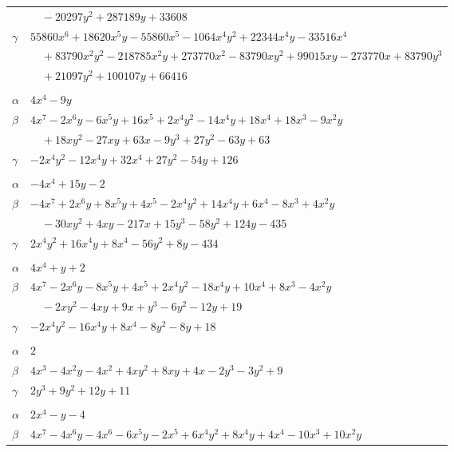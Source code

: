 \documentclass[11pt]{article}
\begin{document}
\begin{longtable}{@{}ll@{}}
 & $\quad -20297y^{2}+287189y+33608$\\
$\gamma$ & $55860x^{6}+18620x^{5}y-55860x^{5}-1064x^{4}y^{2}+22344x^{4}y-33516x^{4}$\\
 & $\quad +83790x^{2}y^{2}-218785x^{2}y+273770x^{2}-83790xy^{2}+99015xy-273770x+83790y^{3}$\\
 & $\quad +21097y^{2}+100107y+66416$\\
\addlinespace[3pt]
\multicolumn{2}{@{}l}{$\{i,j\}=\{5,21\}$, $k_{ij}=2\cdot 3^{2}\cdot 7$}\\
$\alpha$ & $4x^{4}-9y$\\
$\beta$ & $4x^{7}-2x^{6}y-6x^{5}y+16x^{5}+2x^{4}y^{2}-14x^{4}y+18x^{4}+18x^{3}-9x^{2}y$\\
 & $\quad +18xy^{2}-27xy+63x-9y^{3}+27y^{2}-63y+63$\\
$\gamma$ & $-2x^{4}y^{2}-12x^{4}y+32x^{4}+27y^{2}-54y+126$\\
\addlinespace[3pt]
\multicolumn{2}{@{}l}{$\{i,j\}=\{5,27\}$, $k_{ij}=2^{4}\cdot 3^{3}$}\\
$\alpha$ & $-4x^{4}+15y-2$\\
$\beta$ & $-4x^{7}+2x^{6}y+8x^{5}y+4x^{5}-2x^{4}y^{2}+14x^{4}y+6x^{4}-8x^{3}+4x^{2}y$\\
 & $\quad -30xy^{2}+4xy-217x+15y^{3}-58y^{2}+124y-435$\\
$\gamma$ & $2x^{4}y^{2}+16x^{4}y+8x^{4}-56y^{2}+8y-434$\\
\addlinespace[3pt]
\multicolumn{2}{@{}l}{$\{i,j\}=\{5,28\}$, $k_{ij}=2^{2}\cdot 5$}\\
$\alpha$ & $4x^{4}+y+2$\\
$\beta$ & $4x^{7}-2x^{6}y-8x^{5}y+4x^{5}+2x^{4}y^{2}-18x^{4}y+10x^{4}+8x^{3}-4x^{2}y$\\
 & $\quad -2xy^{2}-4xy+9x+y^{3}-6y^{2}-12y+19$\\
$\gamma$ & $-2x^{4}y^{2}-16x^{4}y+8x^{4}-8y^{2}-8y+18$\\
\addlinespace[3pt]
\multicolumn{2}{@{}l}{$\{i,j\}=\{6,10\}$, $k_{ij}=2^{2}$}\\
$\alpha$ & $2$\\
$\beta$ & $4x^{3}-4x^{2}y-4x^{2}+4xy^{2}+8xy+4x-2y^{3}-3y^{2}+9$\\
$\gamma$ & $2y^{3}+9y^{2}+12y+11$\\
\addlinespace[3pt]
\multicolumn{2}{@{}l}{$\{i,j\}=\{6,14\}$, $k_{ij}=3^{2}$}\\
$\alpha$ & $2x^{4}-y-4$\\
$\beta$ & $4x^{7}-4x^{6}y-4x^{6}-6x^{5}y-2x^{5}+6x^{4}y^{2}+8x^{4}y+4x^{4}-10x^{3}+10x^{2}y$\\

\end{longtable}
\end{document}
